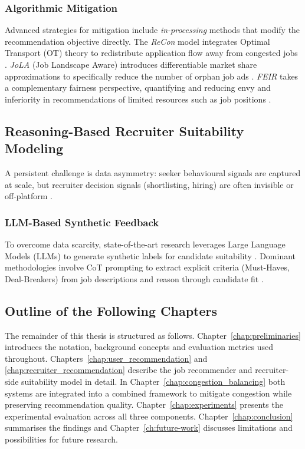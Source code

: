 \subsubsection{Algorithmic Mitigation}
Advanced strategies for mitigation include \textit{in-processing} methods 
that modify the recommendation objective directly. The \textit{ReCon} model 
integrates Optimal Transport (OT) theory to redistribute application flow 
away from congested jobs \cite{mashayekhi2023reconreducingcongestionjob}. 
\textit{JoLA} (Job Landscape Aware) introduces differentiable market share 
approximations to specifically reduce the number of orphan job ads 
\cite{01KAK08E4756SJAF6RCBJVGWXB}. \textit{FEIR} takes a complementary 
fairness perspective, quantifying and reducing envy and inferiority in 
recommendations of limited resources such as job positions 
\cite{li2023feirquantifyingreducingenvy}.

\subsection{Reasoning-Based Recruiter Suitability Modeling}
A persistent challenge is data asymmetry: seeker behavioural signals are captured at scale, but recruiter decision signals (shortlisting, hiring) are often invisible or off-platform \cite{mashayekhi2023challengebasedsurveyerecruitmentrecommendation}.

\subsubsection{LLM-Based Synthetic Feedback}
To overcome data scarcity, state-of-the-art research leverages Large Language Models (LLMs) to generate synthetic labels for candidate suitability \cite{gan2024applicationllmagentsrecruitment}. Dominant methodologies involve \gls{CoT} prompting to extract explicit criteria (Must-Haves, Deal-Breakers) from job descriptions and reason through candidate fit \cite{wei2023chainofthoughtpromptingelicitsreasoning}.


\subsection{Outline of the Following Chapters}
The remainder of this thesis is structured as follows. Chapter~\ref{chap:preliminaries} introduces the notation, background concepts and evaluation metrics used throughout. Chapters~\ref{chap:user_recommendation} and \ref{chap:recruiter_recommendation} describe the job recommender and recruiter-side suitability model in detail. In Chapter~\ref{chap:congestion_balancing} both systems are integrated into a combined framework to mitigate congestion while preserving recommendation quality. Chapter~\ref{chap:experiments} presents the experimental evaluation across all three components. Chapter~\ref{chap:conclusion} summarises the findings and Chapter~\ref{ch:future-work} discusses limitations and possibilities for future research. 
